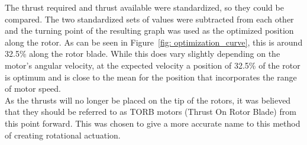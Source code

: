         The thrust required and thrust available were standardized, so they could be compared. The two standardized sets of values were subtracted from each other and the turning point of the resulting graph was used as the optimized position along the rotor. As can be seen in Figure~\ref{fig: optimization_curve}, this is around 32.5\% along the rotor blade. While this does vary slightly depending on the motor's angular velocity, at the expected velocity a position of 32.5\%  of the rotor is optimum and is close to the mean for the position that incorporates the range of motor speed.\\
  
        As the thrusts will no longer be placed on the tip of the rotors, it was believed that they should be referred to as TORB motors (Thrust On Rotor Blade) from this point forward. This was chosen to give a more accurate name to this method of creating rotational actuation.


